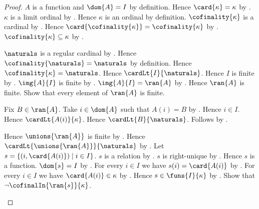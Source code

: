 \begin{proof}
    $A$ is a function and $\dom{A}=I$ by definition.
    Hence $\card{\kappa}=\kappa$ by .
    $\kappa$ is a limit ordinal by
        .
    Hence $\kappa$ is an ordinal by definition.
    $\cofinality{\kappa}$ is a cardinal by
        .
    Hence $\card{\cofinality{\kappa}}=\cofinality{\kappa}$ by
        .
    $\cofinality{\kappa}\subseteq\kappa$ by
        .
    \begin{byCase}
            $\naturals$ is a regular cardinal by
                .
            Hence $\cofinality{\naturals}=\naturals$ by definition.
            Hence $\cofinality{\kappa}=\naturals$.
            Hence $\cardLt{I}{\naturals}$.
            Hence $I$ is finite by .
            $\img{A}{I}$ is finite by
                .
            $\img{A}{I}=\ran{A}$ by .
            Hence $\ran{A}$ is finite.
            Show that every element of $\ran{A}$ is finite.
            \begin{subproof}
                Fix $B\in\ran{A}$.
                Take $i\in\dom{A}$ such that $A(i)=B$ by
                    .
                Hence $i\in I$.
                Hence $\cardLt{A(i)}{\kappa}$.
                Hence $\cardLt{B}{\naturals}$.
                Follows by .
            \end{subproof}
            Hence $\unions{\ran{A}}$ is finite by
                .
            Hence $\cardLt{\unions{\ran{A}}}{\naturals}$ by
                .
            Let $s=\{(i,\card{A(i)})\mid i\in I\}$.
            $s$ is a relation by .
            $s$ is right-unique by .
            Hence $s$ is a function.
            $\dom{s}=I$ by .
            For every $i\in I$ we have $s(i)=\card{A(i)}$ by
                .
            For every $i\in I$ we have $\card{A(i)}\in\kappa$ by
                .
            Hence $s\in\funs{I}{\kappa}$ by .
            Show that $\lnot\cofinalIn{\ran{s}}{\kappa}$.
            \begin{subproof}

\end{subproof}
\end{byCase}
\end{proof}

